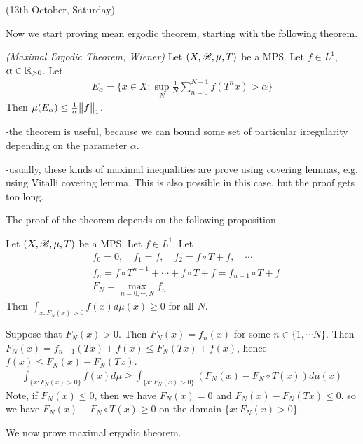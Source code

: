 \documentclass[12pt,a4paper]{report}
\newenvironment{proof}
{\begin{changemargin}{1cm}{0.5cm} 
	}%
	{\end{changemargin}
}
\begin{document}
\newday

(13th October, Saturday)
\s

Now we start proving mean ergodic theorem, starting with the following theorem.
\s

\thm \emph{(Maximal Ergodic Theorem, Wiener)} Let $(X,\mathscr{B}, \mu, T)$ be a MPS. Let $f\in L^1$, $\alpha\in \mathbb{R}_{>0}$. Let
\begin{align*}
E_{\alpha} = \{x\in X : \sup_N \frac{1}{N} \sum_{n=0}^{N-1} f(T^n x) > \alpha \}
\end{align*}
Then $\mu(E_{\alpha}) \leq \frac{1}{\alpha} \bigl\lVert f\bigr\rVert_{1}$.
\s

-the theorem is useful, because we can bound some set of particular irregularity depending on the parameter $\alpha$.

-usually, these kinds of maximal inequalities are prove using covering lemmas, e.g. using Vitalli covering lemma. This is also possible in this case, but the proof gets too long.
\s

The proof of the theorem depends on the following proposition
\s

\prop Let $(X,\mathscr{B}, \mu, T)$ be a MPS. Let $f\in L^1$. Let
\begin{align*}
&f_0 =0, \quad f_1=f, \quad f_2=f\circ T + f, \quad \cdots \\
&f_n = f\circ T^{n-1} + \cdots + f\circ T + f = f_{n-1}\circ T + f \\
&F_N = \max_{n=0,\cdots,N} f_n
\end{align*}
Then $\int_{x:F_N(x)>0} f(x)d\mu(x) \geq 0$ for all $N$.
\begin{proof}
\pf  Suppose that $F_N(x)>0$. Then $F_N(x) =f_n(x)$ for some $n \in \{1,\cdots N\}$. Then $F_N(x) = f_{n-1}(Tx) + f(x) \leq F_N(Tx) +f(x)$, hence $f(x) \leq F_N(x) -F_N(Tx)$.
\begin{align*}
\int_{\{x: F_N(x)>0\}} f(x) d\mu \geq \int_{\{x:F_N(x)>0\}} (F_N(x)-F_N\circ T(x) ) d\mu(x)
\end{align*}
Note, if $F_N(x)\leq 0$, then we have $F_N(x) = 0$ and $F_N(x) - F_N(Tx) \leq 0$, so we have $F_N(x) - F_N \circ T(x) \geq 0$ on the domain $\{x: F_N(x) >0 \}$. 

\eop
\end{proof}
\s

We now prove maximal ergodic theorem.
\end{document}
